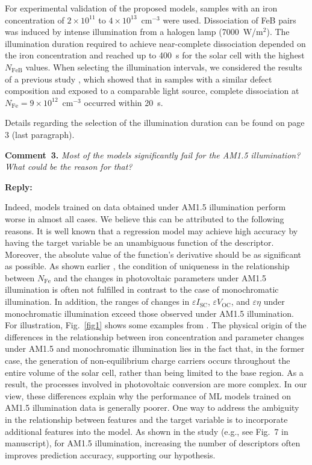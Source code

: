 \documentclass[a4paper,fleqn]{cas-sc}
\begin{document}
For experimental validation of the proposed models, samples with an iron concentration of $2\times10^{11}$ to $4\times10^{13}$~cm$^{-3}$ were used.
Dissociation of FeB pairs was induced by intense illumination from a halogen lamp (7000~W/m$^{2}$).
The illumination duration required to achieve near-complete dissociation depended on the iron concentration
and reached up to 400~s for the solar cell with the highest $N_\mathrm{FeB}$ values.
When selecting the illumination intervals, we considered the results of a previous study \cite{OlikhPSSA},
which showed that in samples with a similar defect composition and exposed to a comparable light source,
complete dissociation at $N_\mathrm{Fe}=9\times10^{12}$~cm$^{-3}$ occurred within 20~s.

Details regarding the selection of the illumination duration can be found on page 3 (last paragraph).




\vspace{1cm}
\noindent
\textcolor[rgb]{0.00,0.50,1.00}{\textbf{Comment~3.}}
\emph{Most of the models significantly fail for the AM1.5 illumination? What could be the reason for that?}

\noindent
\textcolor[rgb]{0.51,0.00,0.00}{\textbf{Reply:}}

Indeed, models trained on data obtained under AM1.5 illumination perform worse in almost all cases.
We believe this can be attributed to the following reasons.
It is well known that a regression model may  achieve high accuracy
by having the target variable be an unambiguous function of the descriptor.
Moreover, the absolute value of the function’s derivative should be as significant as possible.
As shown earlier  \cite{Olikh2025MSEB}, the condition of uniqueness in the relationship between $N_\mathrm{Fe}$ and
the changes in photovoltaic parameters under AM1.5 illumination is often not fulfilled in contrast to the case of monochromatic illumination.
In addition, the ranges of changes in $\varepsilon I_\mathrm{SC}$, $\varepsilon V_\mathrm{OC}$, and $\varepsilon \eta$
under monochromatic illumination exceed those observed under AM1.5 illumination.
For illustration, Fig.~\ref{fig1} shows some examples from  \cite{Olikh2025MSEB}.
The physical origin of the differences in the relationship between iron concentration and
parameter changes under AM1.5 and monochromatic illumination lies in the fact that,
in the former case, the generation of non-equilibrium charge carriers occurs throughout the
entire volume of the solar cell, rather than being limited to the base region.
As a result, the processes involved in photovoltaic conversion are more complex.
In our view, these differences explain why the performance of ML models trained on AM1.5 illumination data is generally poorer.
One way to address the ambiguity in the relationship between features and the target variable
is to incorporate additional features into the model.
As shown in the study (e.g., see Fig.~7 in manuscript),
for AM1.5 illumination, increasing the number of descriptors often improves prediction accuracy, supporting our hypothesis.
\end{document}
